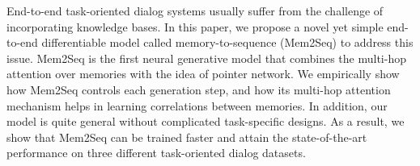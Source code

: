End-to-end task-oriented dialog systems usually suffer from the challenge of incorporating knowledge bases. In this paper, we propose a novel yet simple end-to-end differentiable model called memory-to-sequence (Mem2Seq) to address this issue. Mem2Seq is the first neural generative model that combines the multi-hop attention over memories with the idea of pointer network. We empirically show how Mem2Seq controls each generation step, and how its multi-hop attention mechanism helps in learning correlations between memories. In addition, our model is quite general without complicated task-specific designs. As a result, we show that Mem2Seq can be trained faster and attain the state-of-the-art performance on three different task-oriented dialog datasets.
